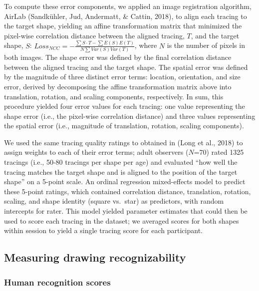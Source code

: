 \documentclass[
  english,
  man]{apa6}
\begin{document}
To compute these error components, we applied an image registration algorithm, AirLab (Sandkühler, Jud, Andermatt, \& Cattin, 2018), to align each tracing to the target shape, yielding an affine transformation matrix that minimized the pixel-wise correlation distance between the aligned tracing, \(T\), and the target shape, \(S\): \(Loss_{NCC} = - \frac{\sum S \cdot T - \sum E(S) E(T)}{N \sum Var(S) Var(T)}\), where \(N\) is the number of pixels in both images. The shape error was defined by the final correlation distance between the aligned tracing and the target shape. The spatial error was defined by the magnitude of three distinct error terms: location, orientation, and size error, derived by decomposing the affine transformation matrix above into translation, rotation, and scaling components, respectively. In sum, this procedure yielded four error values for each tracing: one value representing the shape error (i.e., the pixel-wise correlation distance) and three values representing the spatial error (i.e., magnitude of translation, rotation, scaling components).

We used the same tracing quality ratings to obtained in (Long et al., 2018) to assign weights to each of their error terms; adult observers (\(N\)=70) rated 1325 tracings (i.e., 50-80 tracings per shape per age) and evaluated \enquote{how well the tracing matches the target shape and is aligned to the position of the target shape} on a 5-point scale. An ordinal regression mixed-effects model to predict these 5-point ratings, which contained correlation distance, translation, rotation, scaling, and shape identity (square vs.~star) as predictors, with random intercepts for rater. This model yielded parameter estimates that could then be used to score each tracing in the dataset; we averaged scores for both shapes within session to yield a single tracing score for each participant.

\hypertarget{measuring-drawing-recognizability}{%
\subsection{Measuring drawing recognizability}\label{measuring-drawing-recognizability}}

\hypertarget{human-recognition-scores}{%
\subsubsection{Human recognition scores}\label{human-recognition-scores}}
\end{document}
